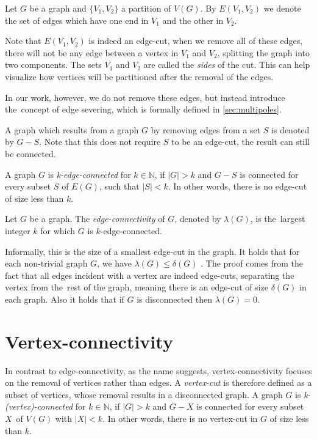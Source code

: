 \documentclass[12pt, twoside]{book}
\begin{document}
\begin{definition}
	Let $G$ be a graph and $\{V_1,V_2\}$ a partition of $V(G)$. By $E(V_1,V_2)$ we denote the set of edges which have one end in $V_1$ and the other in $V_2$.
\end{definition}

Note that $E(V_1,V_2)$ is indeed an edge-cut, when we remove all of these edges, there will not be any edge between a vertex in $V_1$ and $V_2$, splitting the graph into two components. The sets $V_1$ and $V_2$ are called the \textit{sides} of the cut. This can help visualize how vertices will be partitioned after the removal of the edges.

In our work, however, we do not remove these edges, but instead introduce the~concept of edge severing, which is formally defined in \cref{sec:multipoles}.

A graph which results from a graph $G$ by removing edges from a set $S$ is denoted by $G-S$. Note that this does not require $S$ to be an edge-cut, the result can still be connected.

A graph $G$ is \textit{k-edge-connected} for $k\in\mathbb{N}$, if $|G|>k$ and $G-S$ is connected for every subset $S$ of $E(G)$, such that $|S|<k$. In other words, there is no edge-cut of size less than $k$.

\begin{definition}
	Let $G$ be a graph. The \textit{edge-connectivity} of $G$, denoted by $\lambda(G)$, is the~largest integer $k$ for which $G$ is $k$-edge-connected.
\end{definition}

Informally, this is the size of a smallest edge-cut in the graph. It holds that for each non-trivial graph $G$, we have $\lambda(G)\leq\delta(G)$ \cite{Diestel}. The proof comes from the fact that all edges incident with a vertex are indeed edge-cuts, separating the vertex from the~rest of the graph, meaning there is an edge-cut of size $\delta(G)$ in each graph. Also it holds that if $G$ is disconnected then $\lambda(G)=0$.

\section{Vertex-connectivity}

In contrast to edge-connectivity, as the name suggests, vertex-connectivity focuses on the removal of vertices rather than edges. A \textit{vertex-cut} is therefore defined as a subset of vertices, whose removal results in a disconnected graph. A graph $G$ is \textit{k-(vertex)-connected} for $k\in\mathbb{N}$, if $|G|>k$ and $G-X$ is connected for every subset $X$~of $V(G)$ with $|X|<k$. In other words, there is no vertex-cut in $G$ of size less than $k$.
\end{document}
